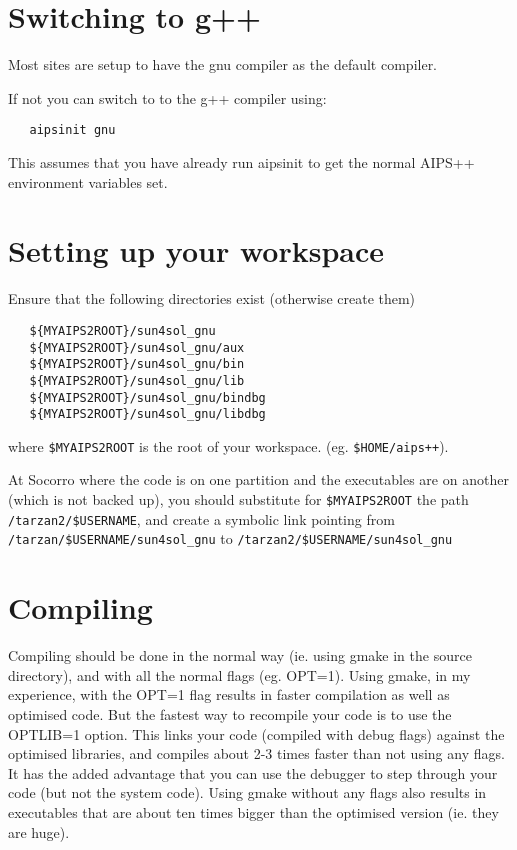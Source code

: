 \section{Switching to g++}
Most sites are setup to have the gnu compiler as the default
compiler. 

If not you can switch to to the g++ compiler using:
\begin{verbatim}
   aipsinit gnu
\end{verbatim}
This assumes that you have already run aipsinit to get the normal
AIPS++ environment variables set.

\section{Setting up your workspace}

Ensure that the following directories exist (otherwise create them)
\begin{verbatim}
   ${MYAIPS2ROOT}/sun4sol_gnu
   ${MYAIPS2ROOT}/sun4sol_gnu/aux
   ${MYAIPS2ROOT}/sun4sol_gnu/bin
   ${MYAIPS2ROOT}/sun4sol_gnu/lib
   ${MYAIPS2ROOT}/sun4sol_gnu/bindbg
   ${MYAIPS2ROOT}/sun4sol_gnu/libdbg
\end{verbatim}
where \texttt{\${MYAIPS2ROOT}} is the root of your workspace. 
(eg. \texttt{\$HOME/aips++}). 

At Socorro where the code is on one partition and the executables are on
another (which is not backed up), you should substitute for
\texttt{\$MYAIPS2ROOT} the path \texttt{/tarzan2/\$USERNAME}, 
and create a symbolic link pointing from
\texttt{/tarzan/\$USERNAME/sun4sol\_gnu}  to
\texttt{/tarzan2/\$USERNAME/sun4sol\_gnu}
 
\section{Compiling}
Compiling should be done in the normal way (ie. using gmake in the
source directory), and with all the normal flags (eg. OPT=1). Using
gmake, in my experience, with the OPT=1 flag results in faster
compilation as well as optimised code. But the fastest way to
recompile your code is to use the OPTLIB=1 option. This links your
code (compiled with debug flags) against the optimised libraries, and
compiles about 2-3 times faster than not using any flags. It has the
added advantage that you can use the debugger to step through your
code (but not the system code). Using gmake without any flags also
results in executables that are about ten times bigger than the
optimised version (ie. they are huge).

